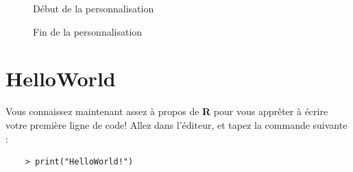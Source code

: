 \documentclass[10.5pt,a4paper]{article}
\begin{document}
\begin{figure}[H]
  \centering
  \caption{Début de la personnalisation}
  \label{rstudio2}
\end{figure}

\begin{figure}[H]
  \centering
  \caption{Fin de la personnalisation}
  \label{rstudio3}
\end{figure}

\section{HelloWorld}

Vous connaissez maintenant assez à propos de \textbf{R} pour vous apprêter à écrire votre première ligne de code! Allez dans l'éditeur, et tapez la commande suivante :
    \begin{lstlisting}
    > print("HelloWorld!")
    \end{lstlisting}
   
\end{document}
